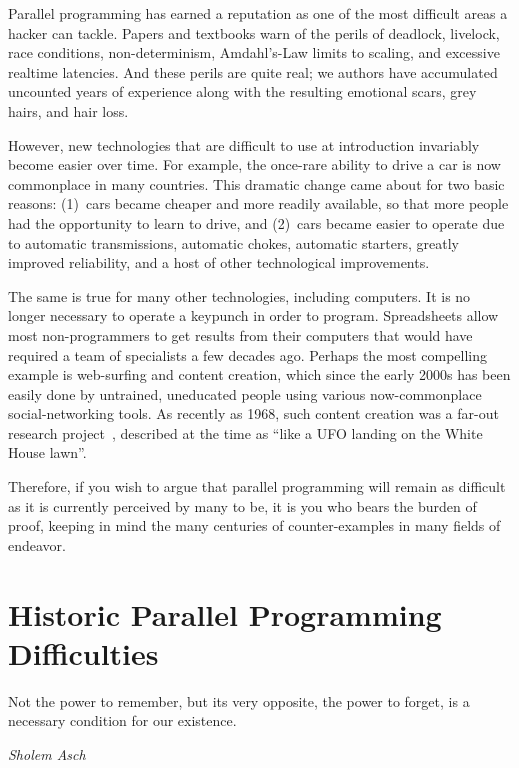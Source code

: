 
%

Parallel programming has earned a reputation as one of the most
difficult areas a hacker can tackle.
Papers and textbooks warn of the perils of deadlock, livelock,
race conditions, non-determinism, Amdahl's-Law limits to scaling,
and excessive realtime latencies.
And these perils are quite real; we authors have accumulated uncounted
years of experience along with the resulting emotional scars,
grey hairs, and hair loss.

However, new technologies that are difficult to use at introduction
invariably become easier over time.
For example, the once-rare ability to drive a car is now
commonplace in many countries.
This dramatic change came about for two basic reasons: (1)~cars became
cheaper and more readily available, so that more people had the
opportunity to learn to drive, and (2)~cars became easier to operate
due to automatic transmissions, automatic chokes, automatic starters,
greatly improved reliability,
and a host of other technological improvements.

The same is true for many other technologies, including computers.
It is no longer necessary to operate a keypunch in order to program.
Spreadsheets allow most non-programmers to get results from their computers
that would have required a team of specialists a few decades ago.
Perhaps the most compelling example is web-surfing and content creation,
which since the early 2000s has been easily done by
untrained, uneducated people using various now-commonplace
social-networking tools.
As recently as 1968, such content creation was a far-out research
project~\cite{DouglasEngelbart1968}, described at
the time as
``like a UFO landing on the White House lawn''\cite{ScottGriffen2000}.

Therefore, if you wish to argue that parallel programming will remain
as difficult as it is currently perceived by many to be, it is you
who bears the burden of proof, keeping in mind the many centuries of
counter-examples in many fields of endeavor.

\section{Historic Parallel Programming Difficulties}
\label{sec:intro:Historic Parallel Programming Difficulties}
%
\epigraph{Not the power to remember, but its very opposite, the power to
	  forget, is a necessary condition for our existence.}
	 {\emph{Sholem Asch}}

